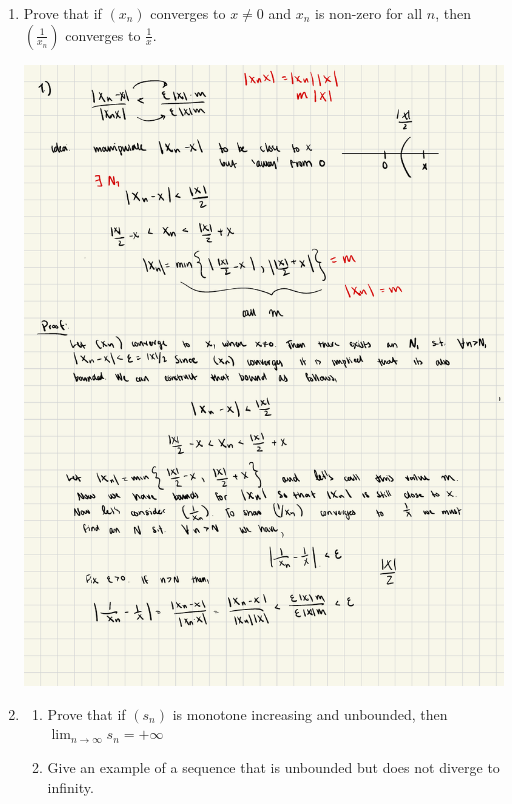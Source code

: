 \documentclass[11pt]{exam}
\begin{document}
    \begin{enumerate}
        \item Prove that if $(x_n)$ converges to $x \neq 0$ and $x_n$ is non-zero for all $n$, then $\left(\frac{1}{x_n}\right)$ converges to $\frac{1}{x}$.
            \begin{solution}
                \includegraphics[width=423pt]{"problem1.pdf"}
            \end{solution}
        \item 
            \begin{enumerate}
                \item Prove that if $(s_n)$ is monotone increasing and unbounded, then $\lim_{n \to \infty} s_n = + \infty$
                \item Give an example of a sequence that is unbounded but does not diverge to infinity.
            \end{enumerate}
            \begin{solution}
                \begin{enumerate}

\end{enumerate}
\end{solution}
\end{enumerate}
\end{document}

